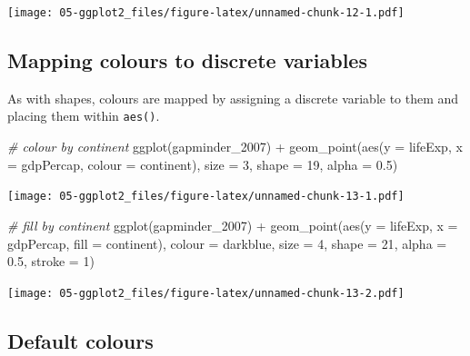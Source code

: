 \documentclass[
]{book}
\newenvironment{Shaded}{\begin{snugshade}}{\end{snugshade}}
\newcommand{\AttributeTok}[1]{\textcolor[rgb]{0.77,0.63,0.00}{#1}}
\newcommand{\CommentTok}[1]{\textcolor[rgb]{0.56,0.35,0.01}{\textit{#1}}}
\newcommand{\DecValTok}[1]{\textcolor[rgb]{0.00,0.00,0.81}{#1}}
\newcommand{\FloatTok}[1]{\textcolor[rgb]{0.00,0.00,0.81}{#1}}
\newcommand{\FunctionTok}[1]{\textcolor[rgb]{0.00,0.00,0.00}{#1}}
\newcommand{\NormalTok}[1]{#1}
\newcommand{\SpecialCharTok}[1]{\textcolor[rgb]{0.00,0.00,0.00}{#1}}
\newcommand{\StringTok}[1]{\textcolor[rgb]{0.31,0.60,0.02}{#1}}
\begin{document}
\texttt{[image: 05-ggplot2\_files/figure-latex/unnamed-chunk-12-1.pdf]}

\hypertarget{mapping-colours-to-discrete-variables}{%
\subsection{Mapping colours to discrete variables}\label{mapping-colours-to-discrete-variables}}

As with shapes, colours are mapped by assigning a discrete variable to them and placing them within \texttt{aes()}.

\begin{Shaded}
\begin{Highlighting}[]
\CommentTok{\# colour by continent}
\FunctionTok{ggplot}\NormalTok{(gapminder\_2007) }\SpecialCharTok{+} 
  \FunctionTok{geom\_point}\NormalTok{(}\FunctionTok{aes}\NormalTok{(}\AttributeTok{y =}\NormalTok{ lifeExp, }\AttributeTok{x =}\NormalTok{ gdpPercap, }\AttributeTok{colour =}\NormalTok{ continent), }\AttributeTok{size =} \DecValTok{3}\NormalTok{, }
             \AttributeTok{shape =} \DecValTok{19}\NormalTok{, }\AttributeTok{alpha =} \FloatTok{0.5}\NormalTok{)}
\end{Highlighting}
\end{Shaded}

\texttt{[image: 05-ggplot2\_files/figure-latex/unnamed-chunk-13-1.pdf]}

\begin{Shaded}
\begin{Highlighting}[]
\CommentTok{\# fill by continent}
\FunctionTok{ggplot}\NormalTok{(gapminder\_2007) }\SpecialCharTok{+} 
  \FunctionTok{geom\_point}\NormalTok{(}\FunctionTok{aes}\NormalTok{(}\AttributeTok{y =}\NormalTok{ lifeExp, }\AttributeTok{x =}\NormalTok{ gdpPercap, }\AttributeTok{fill =}\NormalTok{ continent), }
             \AttributeTok{colour =} \StringTok{\textquotesingle{}darkblue\textquotesingle{}}\NormalTok{, }\AttributeTok{size =} \DecValTok{4}\NormalTok{, }\AttributeTok{shape =} \DecValTok{21}\NormalTok{, }\AttributeTok{alpha =} \FloatTok{0.5}\NormalTok{, }\AttributeTok{stroke =} \DecValTok{1}\NormalTok{)}
\end{Highlighting}
\end{Shaded}

\texttt{[image: 05-ggplot2\_files/figure-latex/unnamed-chunk-13-2.pdf]}

\hypertarget{default-colours}{%
\subsection{Default colours}\label{default-colours}}
\end{document}
